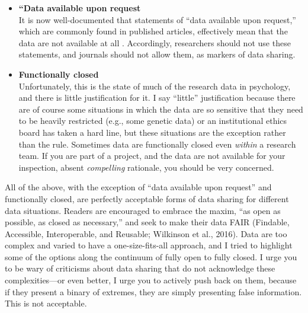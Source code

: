 \documentclass[authordate, empirical]{jote-new-article}
\begin{document}
\begin{itemize}
  \item  \textbf{“Data available upon request}\\
        It is now well-documented that statements of “data available upon request,” which are commonly found in published articles, effectively mean that the data are not available at all \parencites{Gabelica2022}{Miyakawa2020}{Wicherts2006}. Accordingly, researchers should not use these statements, and journals should not allow them, as markers of data sharing.







  \item \textbf{Functionally closed}\\
        Unfortunately, this is the state of much of the research data in psychology, and there is little justification for it. I say “little” justification because there are of course some situations in which the data are so sensitive that they need to be heavily restricted (e.g., some genetic data) or an institutional ethics board has taken a hard line, but these situations are the exception rather than the rule. Sometimes data are functionally closed even \emph{within} a research team. If you are part of a project, and the data are not available for your inspection, absent \emph{compelling} rationale, you should be very concerned.


\end{itemize}





All of the above, with the exception of “data available upon request” and functionally closed, are perfectly acceptable forms of data sharing for different data situations. Readers are encouraged to embrace the maxim, “as open as possible, as closed as necessary,” and seek to make their data FAIR (Findable, Accessible, Interoperable, and Reusable; Wilkinson et al., 2016). Data are too complex and varied to have a one-size-fits-all approach, and I tried to highlight some of the options along the continuum of fully open to fully closed. I urge you to be wary of criticisms about data sharing that do not acknowledge these complexities—or even better, I urge you to actively push back on them, because if they present a binary of extremes, they are simply presenting false information. This is not acceptable.
\end{document}
